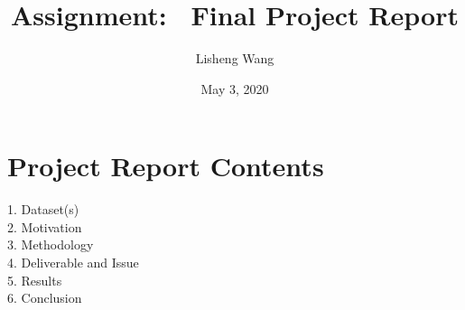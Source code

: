\documentclass[
	12pt, %
]{fphw}
\title{Assignment: \ Final Project Report} %
\author{Lisheng Wang} %
\date{May 3, 2020} %
\institute{Purdue University \\ Department of Computer Science} %
\begin{document}
\maketitle %


\section*{Project Report Contents}

\begin{problem}
1. Dataset(s)\\
2. Motivation\\
3. Methodology\\
4. Deliverable and Issue\\
5. Results\\
6. Conclusion
\end{problem}

\end{document}
